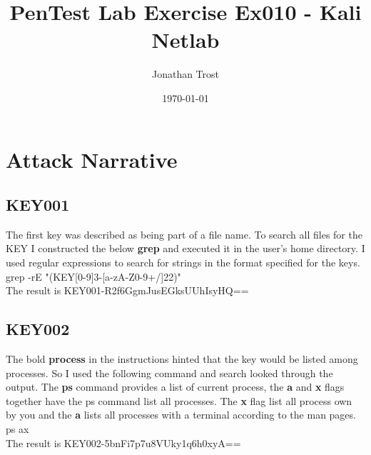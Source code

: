 \documentclass[notitlepage]{article}
\begin{document}
	
	
	\title{PenTest Lab Exercise Ex010 - Kali Netlab}
	\author{Jonathan Trost}
	\date{\isodate\today}
	
	\maketitle
	
	\tableofcontents
	
	\newpage
	\section{Attack Narrative}
	
	\subsection{KEY001}
	The first key was described as being part of a file name. To search all files for the KEY I constructed the below \textbf{grep} and executed it in the user's home directory. I used regular expressions to search for strings in the format specified for the keys. \\
	\indent grep -rE "(KEY[0-9]{3}-[a-zA-Z0-9+/]{22})" \\
	The result is KEY001-R2f6GgmJusEGksUUhIsyHQ== \\
 
	\subsection{KEY002}
	The bold \textbf{process} in the instructions hinted that the key would be listed among processes. So I used the following command and search looked through the output. The \textbf{ps} command provides a list of current process, the \textbf{a} and \textbf{x} flags together have the ps command list all processes. The \textbf{x} flag list all process own by you and the \textbf{a} lists all processes with a terminal according to the man pages. \\
	\indent ps ax \\
	The result is KEY002-5bnFi7p7u8VUky1q6h0xyA==
\end{document}
